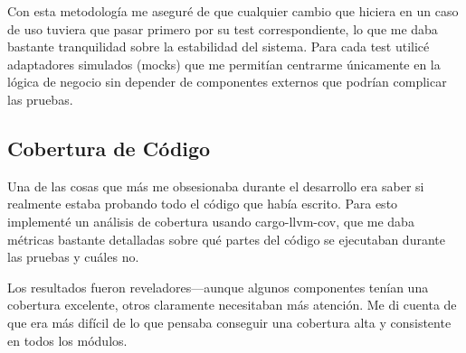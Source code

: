 Con esta metodología me aseguré de que cualquier cambio que hiciera en un caso de uso tuviera que pasar primero por su test correspondiente, lo que me daba bastante tranquilidad sobre la estabilidad del sistema. Para cada test utilicé adaptadores simulados (mocks) que me permitían centrarme únicamente en la lógica de negocio sin depender de componentes externos que podrían complicar las pruebas.

\newpage
\subsection{Cobertura de Código}

Una de las cosas que más me obsesionaba durante el desarrollo era saber si realmente estaba probando todo el código que había escrito. Para esto implementé un análisis de cobertura usando cargo-llvm-cov, que me daba métricas bastante detalladas sobre qué partes del código se ejecutaban durante las pruebas y cuáles no.

Los resultados fueron reveladores—aunque algunos componentes tenían una cobertura excelente, otros claramente necesitaban más atención. Me di cuenta de que era más difícil de lo que pensaba conseguir una cobertura alta y consistente en todos los módulos.

\begin{table}[ht]
    \centering
    \small
    \caption{Métricas de cobertura de código por componente}
    \label{tab:code_coverage_metrics}
\end{table}

